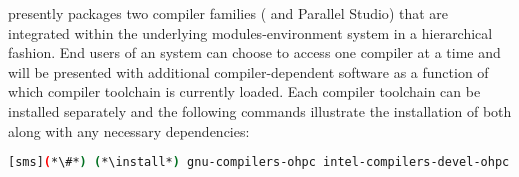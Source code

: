 \OHPC{} presently packages two compiler families ({\GNU{}} and {\IntelR{}
  Parallel Studio}) that are integrated within the underlying
modules-environment system in a hierarchical fashion. End users of an \OHPC{}
system can choose to access one compiler at a time and will be presented with
additional compiler-dependent software as a function of which compiler
toolchain is currently loaded. Each compiler toolchain can be installed
separately and the following commands illustrate the installation of both along
with any necessary dependencies:

\begin{lstlisting}[language=bash]
[sms](*\#*) (*\install*) gnu-compilers-ohpc intel-compilers-devel-ohpc
\end{lstlisting}
